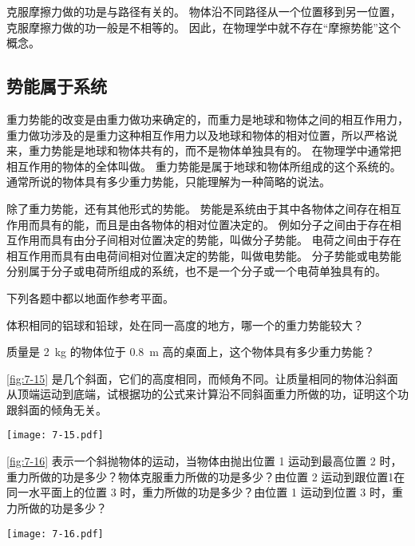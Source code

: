 克服摩擦力做的功是与路径有关的。
物体沿不同路径从一个位置移到另一位置，克服摩擦力做的功一般是不相等的。
因此，在物理学中就不存在“摩擦势能”这个概念。

\subsection{势能属于系统} 
重力势能的改变是由重力做功来确定的，而重力是地球和物体之间的相互作用力，重力做功涉及的是重力这种相互作用力以及地球和物体的相对位置，所以严格说来，重力势能是地球和物体共有的，而不是物体单独具有的。
在物理学中通常把相互作用的物体的全体叫做。
重力势能是属于地球和物体所组成的这个系统的。
通常所说的物体具有多少重力势能，只能理解为一种简略的说法。

除了重力势能，还有其他形式的势能。
势能是系统由于其中各物体之间存在相互作用而具有的能，而且是由各物体的相对位置决定的。
例如分子之间由于存在相互作用而具有由分子间相对位置决定的势能，叫做分子势能。
电荷之间由于存在相互作用而具有由电荷间相对位置决定的势能，叫做电势能。
分子势能或电势能分别属于分子或电荷所组成的系统，也不是一个分子或一个电荷单独具有的。

\begin{Practice}
下列各题中都以地面作参考平面。
\begin{question}
    \item 体积相同的铝球和铅球，处在同一高度的地方，哪一个的重力势能较大？
    \item 质量是 \qty{2}{kg} 的物体位于 \qty{0.8}{m} 高的桌面上，这个物体具有多少重力势能？
    \item \cref{fig:7-15} 是几个斜面，它们的高度相同，而倾角不同。让质量相同的物体沿斜面从顶端运动到底端，试根据功的公式来计算沿不同斜面重力所做的功，证明这个功跟斜面的倾角无关。
\begin{figurehere}
  \texttt{[image: 7-15.pdf]}
  \caption{}\label{fig:7-15}
\end{figurehere}
\item \cref{fig:7-16} 表示一个斜抛物体的运动，当物体由抛出位置 1 运动到最高位置 2 时，重力所做的功是多少？物体克服重力所做的功是多少？由位置 2 运动到跟位置1在同一水平面上的位置 3 时，重力所做的功是多少？由位置 1 运动到位置 3 时，重力所做的功是多少？
\end{question}

\begin{figurehere}
  \texttt{[image: 7-16.pdf]}
  \caption{}\label{fig:7-16}
\end{figurehere}
\end{Practice}

